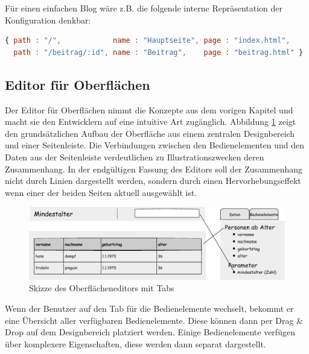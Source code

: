 Für einen einfachen Blog wäre z.B. die folgende interne Repräsentation der Konfiguration denkbar:

\begin{lstlisting}[language=JavaScript, caption=Einfache Routen für einen Blog, label=lst:json:simple-routing-blog]
{ path : "/",            name : "Hauptseite", page : "index.html",
  path : "/beitrag/:id", name : "Beitrag",    page : "beitrag.html" }
\end{lstlisting}

\subsection{Editor für Oberflächen}
\label{sec:design-ui-editor}

Der Editor für Oberflächen nimmt die Konzepte aus dem vorigen Kapitel und macht sie den Entwicklern auf eine intuitive Art zugänglich. Abbildung \ref{fig:ui-editor-sketch-first} zeigt den grundsätzlichen Aufbau der Oberfläche aus einem zentralen Designbereich und einer Seitenleiste. Die Verbindungen zwischen den Bedienelementen und den Daten aus der Seitenleiste verdeutlichen zu Illustrationszwecken deren Zusammenhang. In der endgültigen Fassung des Editors soll der Zusammenhang nicht durch Linien dargestellt werden, sondern durch einen Hervorhebungseffekt wenn einer der beiden Seiten aktuell ausgewählt ist.


\begin{figure}[h]
  \includegraphics[width=\textwidth]{sketches/ui-sketch-first}
  \caption{Skizze des Oberflächeneditors mit Tabs}
  \label{fig:ui-editor-sketch-first}
\end{figure}

Wenn der Benutzer auf den Tab für die Bedienelemente wechselt, bekommt er eine Übersicht aller verfügbaren Bedienelemente. Diese können dann per Drag \& Drop auf dem Designbereich platziert werden. Einige Bedienelemente verfügen über komplexere Eigenschaften, diese werden dann separat dargestellt.

